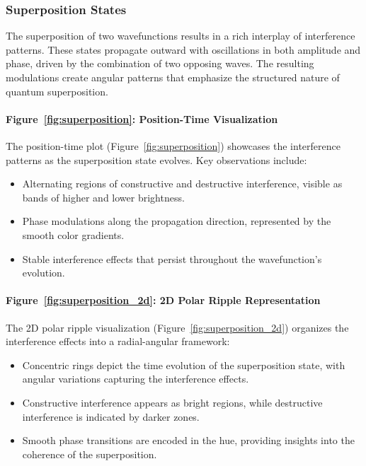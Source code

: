 \documentclass[12pt]{article}
\begin{document}
\subsubsection{Superposition States}
The superposition of two wavefunctions results in a rich interplay of interference patterns. These states propagate outward with oscillations in both amplitude and phase, driven by the combination of two opposing waves. The resulting modulations create angular patterns that emphasize the structured nature of quantum superposition.

\paragraph{Figure~\ref{fig:superposition}: Position-Time Visualization}
The position-time plot (Figure~\ref{fig:superposition}) showcases the interference patterns as the superposition state evolves. Key observations include:
\begin{itemize}
    \item Alternating regions of constructive and destructive interference, visible as bands of higher and lower brightness.
    \item Phase modulations along the propagation direction, represented by the smooth color gradients.
    \item Stable interference effects that persist throughout the wavefunction's evolution.
\end{itemize}

\paragraph{Figure~\ref{fig:superposition_2d}: 2D Polar Ripple Representation}
The 2D polar ripple visualization (Figure~\ref{fig:superposition_2d}) organizes the interference effects into a radial-angular framework:
\begin{itemize}
    \item Concentric rings depict the time evolution of the superposition state, with angular variations capturing the interference effects.
    \item Constructive interference appears as bright regions, while destructive interference is indicated by darker zones.
    \item Smooth phase transitions are encoded in the hue, providing insights into the coherence of the superposition.
\end{itemize}
\end{document}

